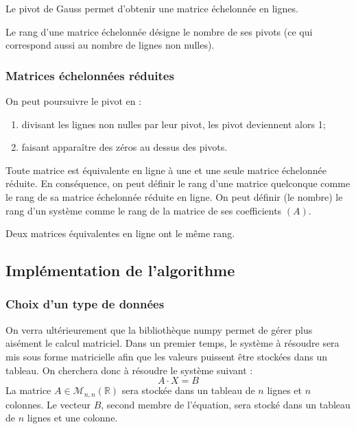 \begin{proposition}
Le pivot de Gauss permet d'obtenir une matrice échelonnée en lignes. 
\end{proposition}

\begin{defi}{}
Le rang d'une matrice échelonnée désigne le nombre de ses pivots (ce qui correspond aussi au nombre de lignes non nulles). 
\end{defi}

\subsubsection{Matrices échelonnées réduites}
On peut poursuivre le pivot en : 
\begin{enumerate}
\item divisant les lignes non nulles par leur pivot, les pivot deviennent alors 1;
\item faisant apparaître des zéros au dessus des pivots. 
\end{enumerate}

\begin{proposition}
Toute matrice est équivalente en ligne à une et une seule matrice échelonnée réduite. 
En conséquence, on peut définir le rang d'une matrice quelconque comme le rang de sa matrice échelonnée réduite en ligne. 
On peut définir (le nombre) le rang d'un système comme le rang de la matrice de ses coefficients $(A)$. 
\end{proposition}

\begin{remarque}
Deux matrices équivalentes en ligne ont le même rang. 
\end{remarque}

\subsection{Implémentation de l'algorithme}

\subsubsection{Choix d'un type de données}
On verra ultérieurement que la bibliothèque numpy permet de gérer plus aisément le calcul matriciel. Dans un premier temps, le système à résoudre sera mis sous forme matricielle afin que les valeurs puissent être stockées dans un tableau. 
On cherchera donc à résoudre le système suivant :
$$
A\cdot X = B
$$
La matrice $A\in\mathcal{M}_{n,n}(\mathbb{R})$ sera stockée dans un tableau de $n$ lignes et $n$ colonnes. Le vecteur $B$, second membre de l'équation, sera stocké dans un tableau de $n$ lignes et une colonne. 


